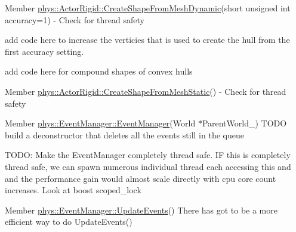 \label{dd/da0/todo__todo000014}
\hypertarget{dd/da0/todo__todo000014}{}
 
\begin{DoxyDescription}
\item[Member \hyperlink{classphys_1_1ActorRigid_aab4a408ce0724be6adf4c9f51f55f8a1}{phys::ActorRigid::CreateShapeFromMeshDynamic}(short unsigned int accuracy=1) ]-\/ Check for thread safety 

add code here to increase the verticies that is used to create the hull from the first accuracy setting. 

add code here for compound shapes of convex hulls 
\end{DoxyDescription}

\label{dd/da0/todo__todo000017}
\hypertarget{dd/da0/todo__todo000017}{}
 
\begin{DoxyDescription}
\item[Member \hyperlink{classphys_1_1ActorRigid_a84554dcaaf2475ba0ec7dcb9235050ac}{phys::ActorRigid::CreateShapeFromMeshStatic}() ]-\/ Check for thread safety 
\end{DoxyDescription}

\label{dd/da0/todo__todo000006}
\hypertarget{dd/da0/todo__todo000006}{}
 
\begin{DoxyDescription}
\item[Member \hyperlink{classphys_1_1EventManager_a148f8c559642d3d50206169b3d0406be}{phys::EventManager::EventManager}(World $\ast$ParentWorld\_\-) ]TODO build a deconstructor that deletes all the events still in the queue 

TODO: Make the EventManager completely thread safe. IF this is completely thread safe, we can spawn numerous individual thread each accessing this and and the performance gain would almost scale directly with cpu core count increases. Look at boost scoped\_\-lock 
\end{DoxyDescription}

\label{dd/da0/todo__todo000003}
\hypertarget{dd/da0/todo__todo000003}{}
 
\begin{DoxyDescription}
\item[Member \hyperlink{classphys_1_1EventManager_a63cf23dc9fe0ced3e2c60ca61c97b166}{phys::EventManager::UpdateEvents}() ]There has got to be a more efficient way to do UpdateEvents() 
\end{DoxyDescription}

\label{dd/da0/todo__todo000004}
\hypertarget{dd/da0/todo__todo000004}{}
 
